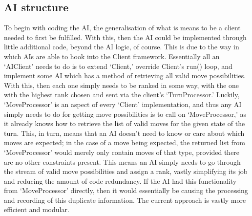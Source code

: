 \documentclass[a4paper,doc,draftfirst]{apa6}
\begin{document}
\subsection{AI structure}
To begin with coding the AI, the generalisation of what is means to be a client needed to first be fulfilled. With this, then the AI could be implemented through little additional code, beyond the AI logic, of course. This is due to the way in which AIs are able to hook into the Client framework. Essentially all an ‘AIClient’ needs to do is to extend ‘Client,’ override Client’s run() loop, and implement some AI which has a method of retrieving all valid move possibilities.  With this, then each one simply needs to be ranked in some way, with the one with the highest rank chosen and sent via the client’s ‘TurnProcessor.’ Luckily, ‘MoveProcessor’ is an aspect of every ‘Client’ implementation, and thus any AI simply needs to do for getting move possibilities is to call on ‘MoveProcessor,’ as it already knows how to retrieve the list of valid moves for the given state of the turn. This, in turn, means that an AI doesn’t need to know or care about which moves are expected; in the case of a move being expected, the returned list from ‘MoveProcessor’ would merely only contain moves of that type, provided there are no other constraints present. This means an AI simply needs to go through the stream of valid move possibilities and assign a rank, vastly simplifying its job and reducing the amount of code redundancy. If the AI had this functionality from ‘MoveProcessor’ directly, then it would essentially be causing the processing and recording of this duplicate information. The current approach is vastly more efficient and modular.
\end{document}

